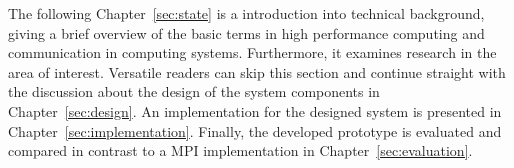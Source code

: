 The following Chapter~\ref{sec:state} is a introduction
into technical background, giving a brief overview of the basic terms
in high performance computing and communication in computing
systems. Furthermore, it examines research in the area of
interest. Versatile readers can skip this section and continue
straight with the discussion about the design of the system components
in Chapter~\ref{sec:design}.  An implementation for the designed
system is presented in Chapter~\ref{sec:implementation}.  Finally, the
developed prototype is evaluated and compared in contrast to a MPI
implementation in Chapter~\ref{sec:evaluation}.


\cleardoublepage

